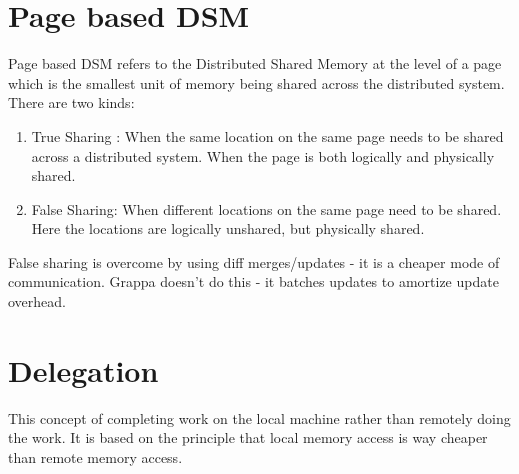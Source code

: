 \documentclass[twoside]{article}
\begin{document}
\section{Page based DSM}
Page based DSM refers to the Distributed Shared Memory at the level of a page which is the smallest unit of memory being shared across the distributed system. There are two kinds: 
\begin{enumerate}
\item True Sharing : When the same location on the same page needs to be shared across a distributed system. When the page is both logically and physically shared.
\item False Sharing: When different locations on the same page need to be shared. Here the locations are logically unshared, but physically shared.
\end{enumerate}
False sharing is overcome by using diff merges/updates - it is a cheaper mode of communication.
Grappa doesn't do this - it batches updates to amortize update overhead.

\section{Delegation}
This concept of completing work on the local machine rather than remotely doing the work. It is based on the principle that local memory access is way cheaper than remote memory access. 
\end{document}
